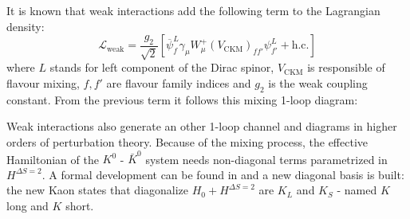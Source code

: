 \documentclass[english, LaM, oneside, noexaminfo]{sapthesis}
\newcommand{\kkb}{$K^0$ - $\bar K^0$ }
\begin{document}
It is known that weak interactions add the following term to the Lagrangian density:
\begin{equation}
    \mathcal{L}_{\text{weak}} = \frac{g_2}{\sqrt{2}} \left[ \overline \psi^L_f \gamma_\mu W^{+}_\mu (V_{\text{CKM}})_{ff'} \psi^L_{f'} + \text{h.c.} \right]
\end{equation}
where $L$ stands for left component of the Dirac spinor, $V_{\text{CKM}}$ is responsible of flavour mixing, $f,f'$ are flavour family indices and $g_2$ is the weak coupling constant.
From the previous term it follows this mixing 1-loop diagram:
\begin{center}
\end{center}
Weak interactions also generate an other 1-loop channel and diagrams in higher orders of perturbation theory.
Because of the mixing process, the effective Hamiltonian of the \kkb system needs non-diagonal terms parametrized in $H^{\Delta S = 2}$.
A formal development can be found in \cite{Donoghue} and a new diagonal basis is built: the new Kaon states that diagonalize $H_0 + H^{\Delta S = 2}$ are $K_{L}$ and $K_{S}$ - named $K$ long and $K$ short.
\end{document}
